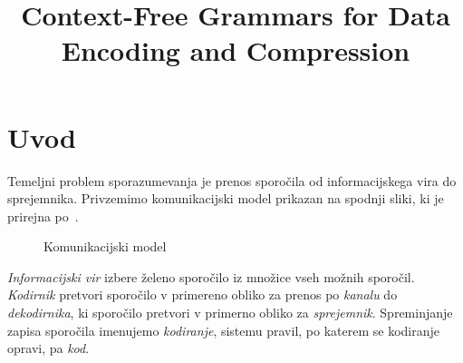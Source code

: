 \documentclass[fin1, tisk]{fmfdelo}
\title{Context-Free Grammars for Data Encoding and Compression}
\theoremstyle{definition}
\begin{document}
\section{Uvod}

Temeljni problem sporazumevanja je prenos sporočila od informacijskega vira do sprejemnika.
Privzemimo komunikacijski model prikazan na spodnji sliki, ki je prirejna po~\cite{Shannon1949}.
\begin{figure}[H]
    \centering
    \caption{Komunikacijski model}
\end{figure}

\emph{Informacijski vir} izbere želeno sporočilo iz množice vseh možnih sporočil.
\emph{Kodirnik} pretvori sporočilo v primereno obliko za prenos po \emph{kanalu}
do \emph{dekodirnika}, ki sporočilo pretvori v primerno obliko za \emph{sprejemnik}.
Spreminjanje zapisa sporočila imenujemo \emph{kodiranje}, sistemu pravil, po katerem se kodiranje
opravi, pa \emph{kod}. 
\end{document}
